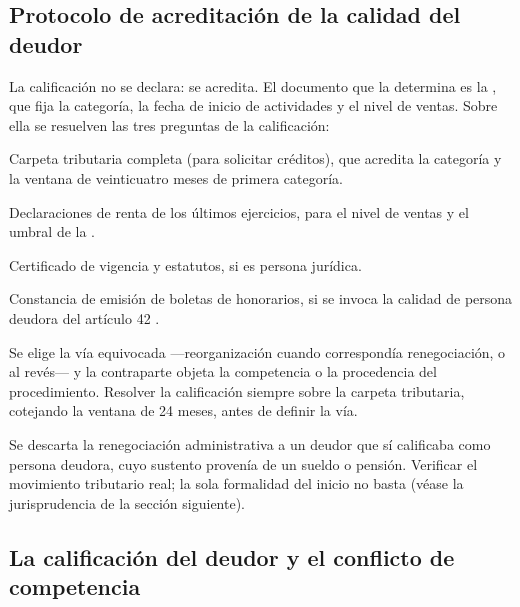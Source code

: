 \subsection{Protocolo de acreditación de la calidad del deudor}

La calificación no se declara: se acredita. El documento que la determina es la
, que fija la categoría, la fecha de inicio
de actividades y el nivel de ventas. Sobre ella se resuelven las tres preguntas de la
calificación:

\begin{checklist}
  \item Carpeta tributaria completa (para solicitar créditos), que acredita la categoría y la
  ventana de veinticuatro meses de primera categoría.
  \item Declaraciones de renta de los últimos ejercicios, para el nivel de ventas y el umbral de
  la \Lpyme{}.
  \item Certificado de vigencia y estatutos, si es persona jurídica.
  \item Constancia de emisión de boletas de honorarios, si se invoca la calidad de persona
  deudora del artículo 42 .
\end{checklist}

{Se elige la vía equivocada ---reorganización cuando correspondía renegociación, o al revés--- y
la contraparte objeta la competencia o la procedencia del procedimiento.}
{Resolver la calificación siempre sobre la carpeta tributaria, cotejando la ventana de 24 meses,
antes de definir la vía.}

{Se descarta la renegociación administrativa a un deudor que sí calificaba como persona deudora,
cuyo sustento provenía de un sueldo o pensión.}
{Verificar el movimiento tributario real; la sola formalidad del inicio no basta (véase la
jurisprudencia de la sección siguiente).}

\bloqueJurisprudencial

\subsection{La calificación del deudor y el conflicto de competencia}

